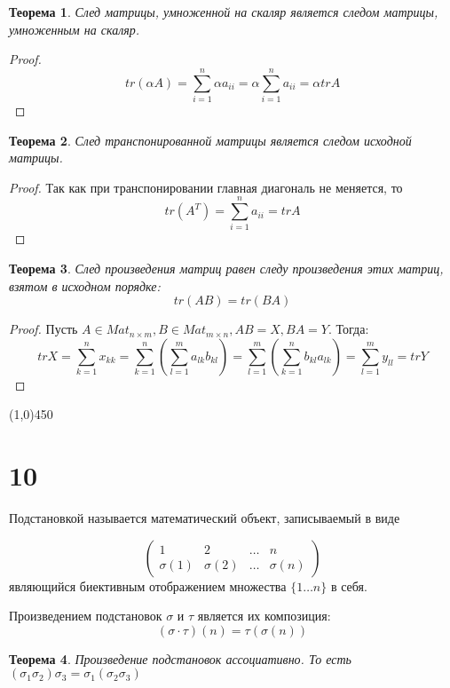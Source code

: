 \documentclass[a4paper,12pt]{article}
\newtheorem*{ther}{Теорема}
\begin{document}
	\begin{ther}
		След матрицы, умноженной на скаляр является следом матрицы, умноженным на скаляр. 
	\end{ther}
	\begin{proof}
		\[
		tr(\alpha A) = \sum_{i = 1}^{n} \alpha a_{ii} = \alpha \sum_{i = 1}^{n} a_{ii} = \alpha trA
		\]
	\end{proof}
	\begin{ther}
		След транспонированной матрицы является следом исходной матрицы. 
	\end{ther}
	\begin{proof}
		Так как при транспонировании главная диагональ не меняется, то
		\[
		tr(A^T) = \sum_{i = 1}^{n} a_{ii} = trA
		\]
	\end{proof}

	\begin{ther}
		След произведения матриц равен следу произведения этих матриц, взятом в исходном порядке:
		\[
		tr(AB) = tr(BA)
		\]
	\end{ther}
	\begin{proof}
		Пусть $A \in Mat_{n \times m}, B \in Mat_{m \times n}, AB = X, BA = Y$. Тогда:
		\[
		trX =
		\sum_{k = 1} ^ {n} x_{kk} = 
		\sum_{k = 1} ^ {n} \left(\sum_{l = 1}^{m}a_{lk}b_{kl}\right) = 
		\sum_{l = 1}^{m}\left(\sum_{k = 1} ^ {n} b_{kl}a_{lk}\right) = 
		\sum_{l = 1}^{m}y_{ll} =
		trY
		\]
	\end{proof}
	
	\begin{center}
		\line(1,0){450}
	\end{center}	
	\section*{10}
	Подстановкой называется математический объект, записываемый в виде 
	
	\[
	\begin{pmatrix}
	1 & 2 & \ldots & n \\
	\sigma(1) & \sigma(2) & \ldots & \sigma(n)
	\end{pmatrix}
	\]
	являющийся биективным отображением множества $\{1 \ldots n\}$ в себя.
	
	Произведением подстановок $\sigma$ и $\tau$ является их композиция:
	\[
		(\sigma \cdot \tau)(n) = \tau(\sigma(n))
	\]
	
	\begin{ther}
		Произведение подстановок ассоциативно. То есть $(\sigma_1 \sigma_2) \sigma_3 = \sigma_1 (\sigma_2 \sigma_3)$
	\end{ther}
\end{document}
